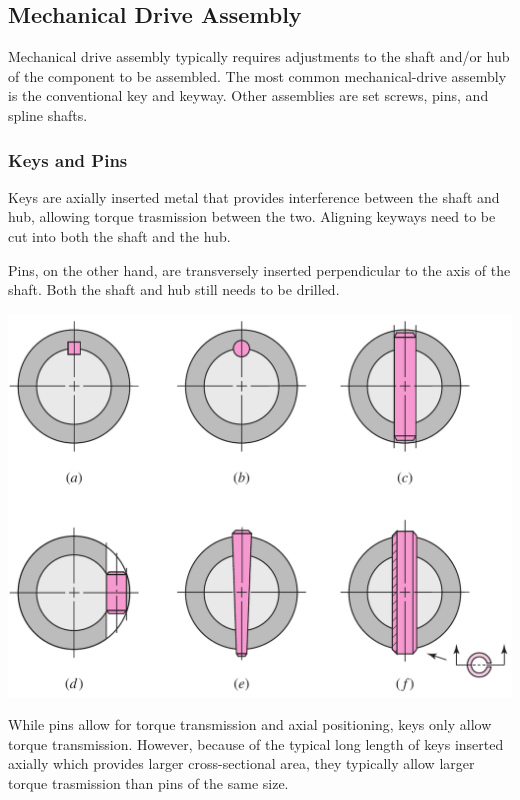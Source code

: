 \documentclass[a4paper,openany]{tufte-book}
\begin{document}
\subsection{Mechanical Drive Assembly}
\label{sec:org55417cc}

Mechanical drive assembly typically requires adjustments to the shaft and/or hub of the component to be assembled. The most common mechanical-drive assembly is the conventional key and keyway. Other assemblies are set screws, pins, and spline shafts.

\subsubsection{Keys and Pins}
\label{sec:org112f17d}

Keys are axially inserted metal that provides interference between the shaft and hub, allowing torque trasmission between the two. Aligning keyways need to be cut into both the shaft and the hub.

Pins, on the other hand, are transversely inserted perpendicular to the axis of the shaft. Both the shaft and hub still needs to be drilled.

\begin{center}
\includegraphics[width=.9\linewidth]{./pictures/Shafts/keys-pins.png}
\end{center}

While pins allow for torque transmission and axial positioning, keys only allow torque transmission. However, because of the typical long length of keys inserted axially which provides larger cross-sectional area, they typically allow larger torque trasmission than pins of the same size.
\end{document}
